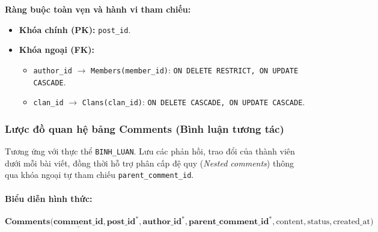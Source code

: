 \noindent\textbf{Ràng buộc toàn vẹn và hành vi tham chiếu:}
\begin{itemize}[noitemsep,topsep=2pt]
    \item \textbf{Khóa chính (PK):} \texttt{post\_id}.
    \item \textbf{Khóa ngoại (FK):}
    \begin{itemize}[noitemsep]
        \item \texttt{author\_id} $\rightarrow$ \texttt{Members(member\_id)}: \texttt{ON DELETE RESTRICT, ON UPDATE CASCADE}.
        \item \texttt{clan\_id} $\rightarrow$ \texttt{Clans(clan\_id)}: \texttt{ON DELETE CASCADE, ON UPDATE CASCADE}.
    \end{itemize}
\end{itemize}

\subsubsection{Lược đồ quan hệ bảng Comments (Bình luận tương tác)}
Tương ứng với thực thể \texttt{BINH\_LUAN}. Lưu các phản hồi, trao đổi của thành viên dưới mỗi bài viết, đồng thời hỗ trợ phân cấp đệ quy (\textit{Nested comments}) thông qua khóa ngoại tự tham chiếu \texttt{parent\_comment\_id}.

\paragraph{Biểu diễn hình thức:}
\[
\textbf{Comments}\big(
\underline{\textbf{comment\_id}}, \textbf{post\_id}^*, \textbf{author\_id}^*, \textbf{parent\_comment\_id}^*, \text{content}, \text{status}, \text{created\_at}
\big)
\]

